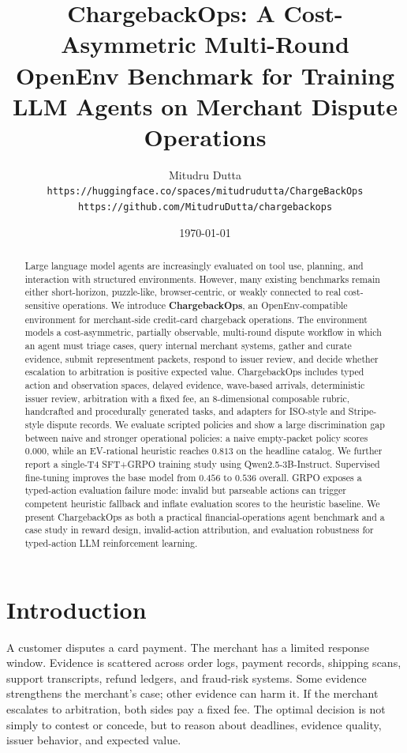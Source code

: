\documentclass[11pt]{article}
\title{\textbf{ChargebackOps: A Cost-Asymmetric Multi-Round OpenEnv Benchmark for Training LLM Agents on Merchant Dispute Operations}}
\author{
    Mitudru Dutta \\
    \texttt{https://huggingface.co/spaces/mitudrudutta/ChargeBackOps} \\
    \texttt{https://github.com/MitudruDutta/chargebackops}
}
\date{\today}
\begin{document}
\maketitle

\begin{abstract}
Large language model agents are increasingly evaluated on tool use, planning, and interaction with structured environments. However, many existing benchmarks remain either short-horizon, puzzle-like, browser-centric, or weakly connected to real cost-sensitive operations. We introduce \textbf{ChargebackOps}, an OpenEnv-compatible environment for merchant-side credit-card chargeback operations. The environment models a cost-asymmetric, partially observable, multi-round dispute workflow in which an agent must triage cases, query internal merchant systems, gather and curate evidence, submit representment packets, respond to issuer review, and decide whether escalation to arbitration is positive expected value. ChargebackOps includes typed action and observation spaces, delayed evidence, wave-based arrivals, deterministic issuer review, arbitration with a fixed fee, an 8-dimensional composable rubric, handcrafted and procedurally generated tasks, and adapters for ISO-style and Stripe-style dispute records. We evaluate scripted policies and show a large discrimination gap between naive and stronger operational policies: a naive empty-packet policy scores $0.000$, while an EV-rational heuristic reaches $0.813$ on the headline catalog. We further report a single-T4 SFT+GRPO training study using Qwen2.5-3B-Instruct. Supervised fine-tuning improves the base model from $0.456$ to $0.536$ overall. GRPO exposes a typed-action evaluation failure mode: invalid but parseable actions can trigger competent heuristic fallback and inflate evaluation scores to the heuristic baseline. We present ChargebackOps as both a practical financial-operations agent benchmark and a case study in reward design, invalid-action attribution, and evaluation robustness for typed-action LLM reinforcement learning.
\end{abstract}

\section{Introduction}

A customer disputes a card payment. The merchant has a limited response window. Evidence is scattered across order logs, payment records, shipping scans, support transcripts, refund ledgers, and fraud-risk systems. Some evidence strengthens the merchant's case; other evidence can harm it. If the merchant escalates to arbitration, both sides pay a fixed fee. The optimal decision is not simply to contest or concede, but to reason about deadlines, evidence quality, issuer behavior, and expected value.
\end{document}
